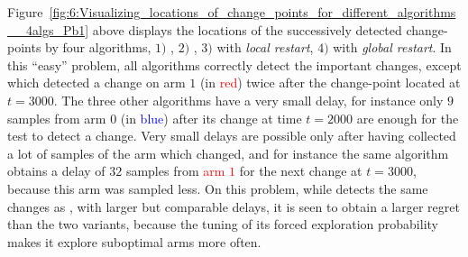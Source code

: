Figure~\ref{fig:6:Visualizing_locations_of_change_points_for_different_algorithms__4algs_Pb1} above displays the locations of the successively detected change-points by four algorithms,
$1)$ \MklUCB,
$2)$ \CUSUMklUCB,
$3)$ \GLRklUCB{} with \emph{local restart},
$4)$ \GLRklUCB{} with \emph{global restart}.
In this ``easy'' problem, all algorithms correctly detect the important changes, except \CUSUM{} which detected a change on arm $1$ (in \textcolor{red}{red}) twice after the change-point located at $t=3000$.
The three other algorithms have a very small delay, for instance only $9$ samples from arm $0$ (in \textcolor{blue}{blue}) after its change at time $t=2000$ are enough for the \GLR{} test to detect a change.
Very small delays are possible only after having collected a lot of samples of the arm which changed, and for instance the same algorithm obtains a delay of $32$ samples from \textcolor{red}{arm $1$} for the next change at $t=3000$, because this arm was sampled less.
On this problem, while \MklUCB{} detects the same changes as \GLRklUCB, with larger but comparable delays, it is seen to obtain a larger regret than the two \GLR{} variants, because the tuning of its forced exploration probability makes it explore suboptimal arms more often.



